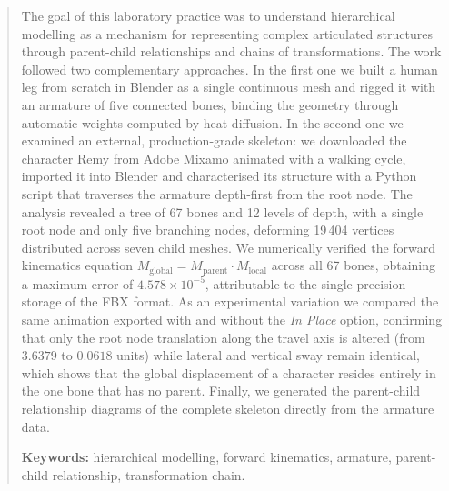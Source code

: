 \renewcommand{\abstractname}{Abstract}
\begin{abstract}
The goal of this laboratory practice was to understand hierarchical modelling as a mechanism for representing complex articulated structures through parent-child relationships and chains of transformations. The work followed two complementary approaches. In the first one we built a human leg from scratch in Blender as a single continuous mesh and rigged it with an armature of five connected bones, binding the geometry through automatic weights computed by heat diffusion. In the second one we examined an external, production-grade skeleton: we downloaded the character Remy from Adobe Mixamo animated with a walking cycle, imported it into Blender and characterised its structure with a Python script that traverses the armature depth-first from the root node. The analysis revealed a tree of 67 bones and 12 levels of depth, with a single root node and only five branching nodes, deforming 19\,404 vertices distributed across seven child meshes. We numerically verified the forward kinematics equation $M_{\text{global}} = M_{\text{parent}} \cdot M_{\text{local}}$ across all 67 bones, obtaining a maximum error of $4.578 \times 10^{-5}$, attributable to the single-precision storage of the FBX format. As an experimental variation we compared the same animation exported with and without the \textit{In Place} option, confirming that only the root node translation along the travel axis is altered (from $3.6379$ to $0.0618$ units) while lateral and vertical sway remain identical, which shows that the global displacement of a character resides entirely in the one bone that has no parent. Finally, we generated the parent-child relationship diagrams of the complete skeleton directly from the armature data.

\textbf{Keywords:} hierarchical modelling, forward kinematics, armature, parent-child relationship, transformation chain.
\end{abstract}
